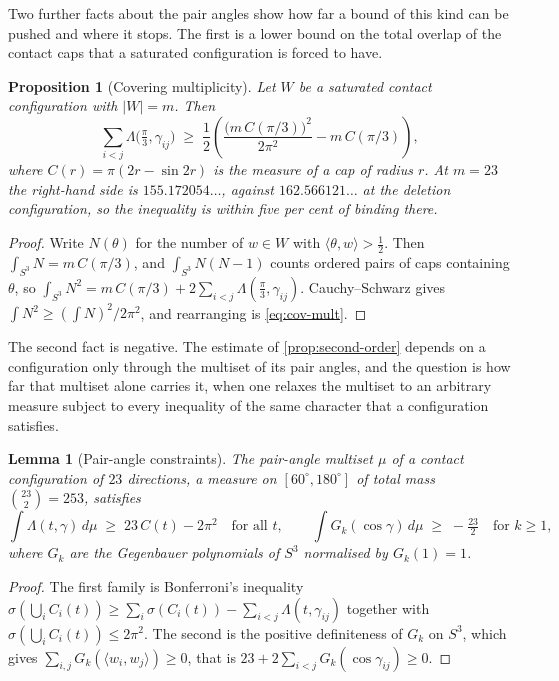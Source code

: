 \documentclass[11pt,reqno]{amsart}
\renewcommand{\_}{\origunderscore\allowbreak}
\numberwithin{equation}{section}
\theoremstyle{plain}
\newtheorem{prop}[thm]{Proposition}
\newtheorem{lem}[thm]{Lemma}
\theoremstyle{definition}
\theoremstyle{remark}
\begin{document}
Two further facts about the pair angles show how far a bound of this
kind can be pushed and where it stops. The first is a lower bound on the total overlap of the contact caps
that a saturated configuration is forced to have.

\begin{prop}[Covering multiplicity]\label{prop:cov-mult}
Let $W$ be a saturated contact configuration with $|W|=m$. Then
\begin{equation}\label{eq:cov-mult}
  \sum_{i<j}\Lambda\bigl(\tfrac\pi3,\gamma_{ij}\bigr)
  \;\ge\;\frac12\left(\frac{\bigl(m\,C(\pi/3)\bigr)^2}{2\pi^2}
    -m\,C(\pi/3)\right),
\end{equation}
where $C(r)=\pi(2r-\sin2r)$ is the measure of a cap of radius $r$. At
$m=23$ the right-hand side is $155.172054\ldots$, against
$162.566121\ldots$ at the deletion configuration, so the inequality is
within five per cent of binding there.
\end{prop}

\begin{proof}
Write $N(\theta)$ for the number of $w\in W$ with
$\langle\theta,w\rangle>\tfrac12$. Then $\int_{S^3}N=m\,C(\pi/3)$, and
$\int_{S^3}N(N-1)$ counts ordered pairs of caps containing $\theta$, so
$\int_{S^3}N^2=m\,C(\pi/3)+2\sum_{i<j}\Lambda(\tfrac\pi3,\gamma_{ij})$.
Cauchy--Schwarz gives $\int N^2\ge(\int N)^2/2\pi^2$, and rearranging is
\eqref{eq:cov-mult}.
\end{proof}

The second fact is negative. The estimate of \cref{prop:second-order}
depends on a configuration only through the multiset of its pair
angles, and the question is how far that multiset alone carries it, when
one relaxes the multiset to an arbitrary measure subject to every
inequality of the same character that a configuration satisfies.

\begin{lem}[Pair-angle constraints]\label{lem:pair-angle-constraints}
The pair-angle multiset $\mu$ of a contact configuration of $23$
directions, a measure on $[60^\circ,180^\circ]$ of total mass
$\binom{23}2=253$, satisfies
\[
  \int\Lambda(t,\gamma)\,d\mu\;\ge\;23\,C(t)-2\pi^2
  \quad\text{for all } t,
  \qquad
  \int G_k(\cos\gamma)\,d\mu\;\ge\;-\tfrac{23}2
  \quad\text{for }k\ge1,
\]
where $G_k$ are the Gegenbauer polynomials of $S^3$ normalised by
$G_k(1)=1$.
\end{lem}

\begin{proof}
The first family is Bonferroni's inequality
$\sigma(\bigcup_iC_i(t))\ge\sum_i\sigma(C_i(t))-\sum_{i<j}\Lambda(t,\gamma_{ij})$
together with $\sigma(\bigcup_iC_i(t))\le2\pi^2$. The second is the
positive definiteness of $G_k$ on $S^3$, which gives
$\sum_{i,j}G_k(\langle w_i,w_j\rangle)\ge0$, that is
$23+2\sum_{i<j}G_k(\cos\gamma_{ij})\ge0$.
\end{proof}
\end{document}
